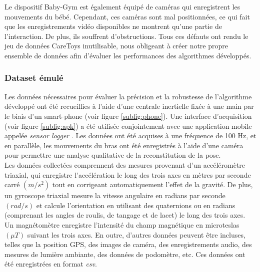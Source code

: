 \documentclass[5pt]{article}
\begin{document}
Le dispositif Baby-Gym est également équipé de caméras qui enregistrent les mouvements du bébé. Cependant, ces caméras sont mal positionnées, ce qui fait que les enregistrements vidéo disponibles ne montrent qu'une partie de l'interaction. De plus, ils souffrent d'obstructions. Tous ces défauts ont rendu le jeu de données CareToys inutilisable, nous obligeant à créer notre propre ensemble de données afin d'évaluer les performances des algorithmes développés. 
\subsubsection{Dataset émulé}
Les données nécessaires pour évaluer la précision et la robustesse de l'algorithme développé ont été recueillies à l'aide d'une centrale inertielle fixée à une main par le biais d'un smart-phone (voir figure \ref{subfig:phone}). Une interface d'acquisition (voir figure \ref{subfig:apk}) a été utilisée conjointement avec une application mobile appelée \textit{sensor logger}  \cite{choi_awesome_2023}. Les données ont été acquises à une fréquence de 100 Hz, et en parallèle, les mouvements du bras ont été enregistrés à l'aide d'une caméra pour permettre une analyse qualitative de la reconstitution de la pose.\\
Les données collectées comprennent des mesures provenant d'un accéléromètre triaxial, qui enregistre l'accélération le long des trois axes en mètres par seconde carré $(m/s^2)$ tout en corrigeant automatiquement l'effet de la gravité. De plus, un gyroscope triaxial mesure la vitesse angulaire en radians par seconde $(rad/s)$ et calcule l'orientation en utilisant des quaternions ou en radians (comprenant les angles de roulis, de tangage et de lacet) le long des trois axes. Un magnétomètre enregistre l'intensité du champ magnétique en microteslas $(\mu T)$ suivant les trois axes. En outre, d'autres données peuvent être incluses, telles que la position GPS, des images de caméra, des enregistrements audio, des mesures de lumière ambiante, des données de podomètre, etc. Ces données ont été enregistrées en format \textit{csv}.
\end{document}

